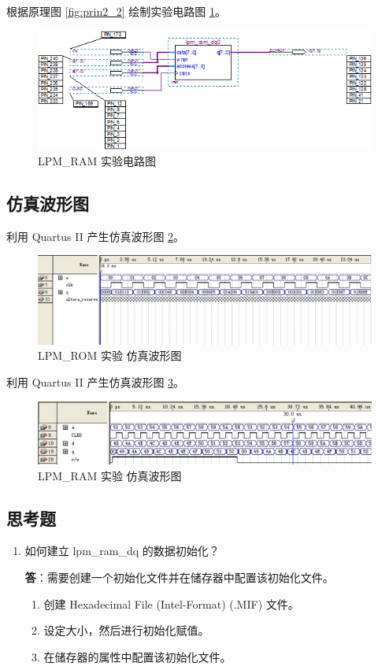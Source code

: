 根据原理图 \ref{fig:prin2_2} 绘制实验电路图 \ref{fig:bdf2_2}。

\begin{figure}[H]
\centering
\includegraphics[width=\textwidth]{images/bdf2_2.png}
\caption{LPM\_RAM 实验电路图}
\label{fig:bdf2_2}
\end{figure}

\subsection{仿真波形图}

利用 Quartus II 产生仿真波形图 \ref{fig:wave2_1}。

\begin{figure}[H]
\centering
\includegraphics[width=\textwidth]{images/wave2_1.png}
\caption{LPM\_ROM 实验 仿真波形图}
\label{fig:wave2_1}
\end{figure}

利用 Quartus II 产生仿真波形图 \ref{fig:wave2_2}。

\begin{figure}[H]
\centering
\includegraphics[width=\textwidth]{images/wave2_2.png}
\caption{LPM\_RAM 实验 仿真波形图}
\label{fig:wave2_2}
\end{figure}

\subsection{思考题}

\begin{enumerate}
    \item 如何建立 lpm\_ram\_dq 的数据初始化？
    
    \textbf{答}：需要创建一个初始化文件并在储存器中配置该初始化文件。
    
    \begin{enumerate}
        \item 创建 Hexadecimal File (Intel-Format) (.MIF) 文件。
        \item 设定大小，然后进行初始化赋值。
        \item 在储存器的属性中配置该初始化文件。
    \end{enumerate}
    
\end{enumerate}
